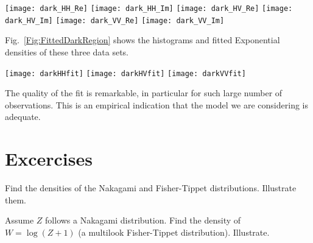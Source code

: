 \begin{figure*}
\centering
\texttt{[image: dark\_HH\_Re]}
\texttt{[image: dark\_HH\_Im]}
\texttt{[image: dark\_HV\_Re]}
\texttt{[image: dark\_HV\_Im]}
\texttt{[image: dark\_VV\_Re]}
\texttt{[image: dark\_VV\_Im]}
\caption{Histograms and fitted Gaussian densities over the dark region of Fig.~\ref{Im:Oberpfaffenhofen_RGB}}\label{Fig:FittedDarkRegion_Complex}
\end{figure*}

Fig.~\ref{Fig:FittedDarkRegion} shows the histograms and fitted Exponential densities of these three data sets.

\begin{figure*}
\centering
\texttt{[image: darkHHfit]}
\texttt{[image: darkHVfit]}
\texttt{[image: darkVVfit]}
\caption{Histograms and fitted Exponential densities over the dark region of Fig.~\ref{Im:Oberpfaffenhofen_RGB}}\label{Fig:FittedDarkRegion}
\end{figure*}

The quality of the fit is remarkable, in particular for such large number of observations.
This is an empirical indication that the model we are considering is adequate.



\section*{Excercises}

\begin{exer}
Find the densities of the Nakagami and Fisher-Tippet distributions.
Illustrate them.
\end{exer}

\begin{exer}
Assume $Z$ follows a Nakagami distribution.
Find the density of $W=\log(Z+1)$ (a multilook Fisher-Tippet distribution).
Illustrate.
\end{exer}
